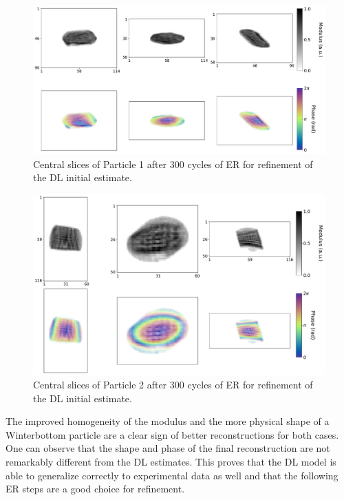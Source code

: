 \begin{figure}[H]
    \centering
    \includegraphics[width=\textwidth]{figures/Phasing/exp_data_dlpynx1.pdf}
    \caption{Central slices of Particle 1 after 300 cycles of ER for refinement of the DL initial estimate. }
    \label{fig:dlpynx_rec1}
\end{figure}

\begin{figure}[H]
    \centering
    \includegraphics[width=\textwidth]{figures/Phasing/exp_data_dlpynx2.pdf}
    \caption{Central slices of Particle 2 after 300 cycles of ER for refinement of the DL initial estimate.}
    \label{fig:dlpynx_rec2}
\end{figure}

The improved homogeneity of the modulus and the more physical shape of a Winterbottom particle are a clear sign of 
better reconstructions for both cases. One can observe that the shape and phase of the final reconstruction are not 
remarkably different from the DL estimates. This proves that the DL model is able to generalize correctly to experimental 
data as well and that the following ER steps are a good choice for refinement. \\

